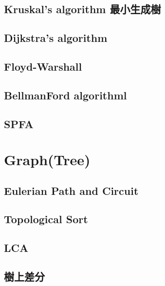 \subsection{Kruskal’s algorithm 最小生成樹}


\subsection{Dijkstra’s algorithm}


\subsection{Floyd-Warshall}


\subsection{BellmanFord algorithml}


\subsection{SPFA}


\section{Graph(Tree)}

\subsection{Eulerian Path and Circuit}


\subsection{Topological Sort}


\subsection{LCA}


\subsection{樹上差分}


